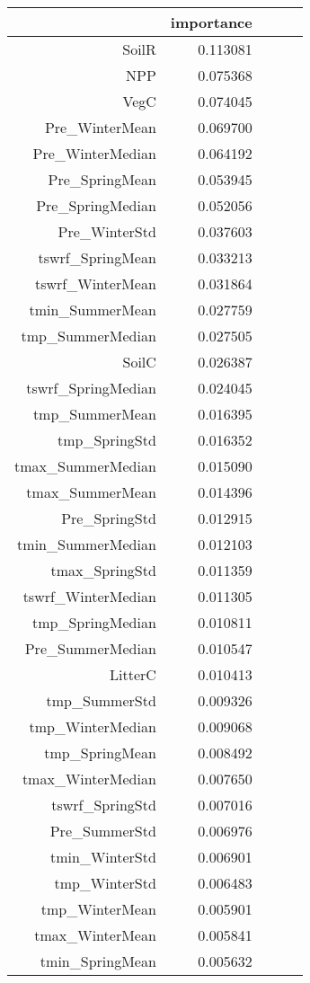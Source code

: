 \begin{tabular}{rrrrr}
\toprule
 & importance \\
\midrule
SoilR & 0.113081 \\
NPP & 0.075368 \\
VegC & 0.074045 \\
Pre_WinterMean & 0.069700 \\
Pre_WinterMedian & 0.064192 \\
Pre_SpringMean & 0.053945 \\
Pre_SpringMedian & 0.052056 \\
Pre_WinterStd & 0.037603 \\
tswrf_SpringMean & 0.033213 \\
tswrf_WinterMean & 0.031864 \\
tmin_SummerMean & 0.027759 \\
tmp_SummerMedian & 0.027505 \\
SoilC & 0.026387 \\
tswrf_SpringMedian & 0.024045 \\
tmp_SummerMean & 0.016395 \\
tmp_SpringStd & 0.016352 \\
tmax_SummerMedian & 0.015090 \\
tmax_SummerMean & 0.014396 \\
Pre_SpringStd & 0.012915 \\
tmin_SummerMedian & 0.012103 \\
tmax_SpringStd & 0.011359 \\
tswrf_WinterMedian & 0.011305 \\
tmp_SpringMedian & 0.010811 \\
Pre_SummerMedian & 0.010547 \\
LitterC & 0.010413 \\
tmp_SummerStd & 0.009326 \\
tmp_WinterMedian & 0.009068 \\
tmp_SpringMean & 0.008492 \\
tmax_WinterMedian & 0.007650 \\
tswrf_SpringStd & 0.007016 \\
Pre_SummerStd & 0.006976 \\
tmin_WinterStd & 0.006901 \\
tmp_WinterStd & 0.006483 \\
tmp_WinterMean & 0.005901 \\
tmax_WinterMean & 0.005841 \\
tmin_SpringMean & 0.005632 \\

\end{tabular}
